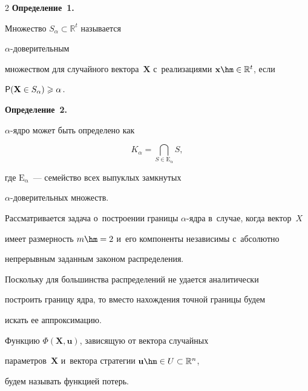 \begin{multicols}{2}
\textbf{Определение~1.}\

{Множество $S_\alpha \subset \mathbb R^t$  называется  

\mbox{$\alpha$-до}\-ве\-ри\-тель\-ным 

множеством для случайного вектора~$\mathbf X$ с~реализациями $\mathbf x \hm\in 

\mathbb R^t$, если}

${\sf P}(\mathbf X \in S_\alpha)\geqslant \alpha\,.$



\smallskip



\noindent

\textbf{Определение~2.}

{$\alpha$-яд\-ро может быть определено как}

\begin{equation*}

K_\alpha=\bigcap\limits_{S\in \mathrm{E_\alpha} }S,

\end{equation*}

где $\mathrm{E_\alpha}$~--- семейство всех вы\-пук\-лых замк\-ну\-тых 

\mbox{$\alpha$-до}\-ве\-ри\-тель\-ных множеств.



\smallskip



Рассматривается задача о~построении границы $\alpha$-яд\-ра в~случае, когда век\-тор~$X$ 

имеет размерность $m\hm=2$  и~его компоненты независимы с~абсолютно 

непрерывным заданным законом рас\-пре\-де\-ле\-ния.



Поскольку для большинства распределений не удается аналитически 

по\-стро\-ить границу ядра, то вместо на\-хож\-де\-ния точ\-ной границы будем 

искать ее аппроксимацию.





Функцию $\Phi(\mathbf X,\mathbf u)$, зависящую от век\-то\-ра случайных 

па\-ра\-мет\-ров~$\mathbf X$ и~вектора стратегии $\mathbf u\hm\in U\subset \mathbb R^n$, 

будем называть функ\-ци\-ей потерь.






\end{multicols}
